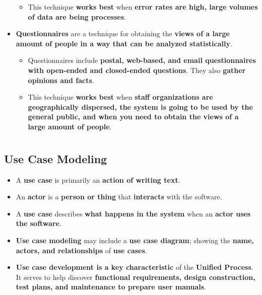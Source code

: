 \documentclass[16pt]{article}
\begin{document}
\begin{itemize}
\begin{itemize}
            \item This technique \textbf{works best} when \textbf{error rates are high, large volumes of data are being processes}.
        \end{itemize}
        \item \textbf{Questionnaires} are a technique for obtaining the \textbf{views of a large amount of people in a way that can be analyzed statistically}.
        \begin{itemize}
            \item Questionnaires include \textbf{postal, web-based, and email questionnaires with open-ended and closed-ended questions}. They also \textbf{gather opinions and facts}.
            \item This technique \textbf{works best} when \textbf{staff organizations are geographically dispersed, the system is going to be used by the general public, and when you need to obtain the views of a large amount of people}.
        \end{itemize}
    \end{itemize}

    \section*{}

    \subsection*{Use Case Modeling}
    \begin{itemize}
        \item A \textbf{use case} is primarily an \textbf{action of writing text}.
        \item An \textbf{actor} is a \textbf{person or thing} that \textbf{interacts} with the software.
        \item A \textbf{use case} describes \textbf{what happens in the system} when an \textbf{actor uses the software}.
        \item \textbf{Use case modeling} may include a \textbf{use case diagram}; showing the \textbf{name, actors, and relationships} of \textbf{use cases}.
        \item \textbf{Use case development is a key characteristic} of the \textbf{Unified Process}. It serves to help discover \textbf{functional requirements, design construction, test plans, and maintenance to prepare user manuals}.
    \end{itemize}
\end{document}
